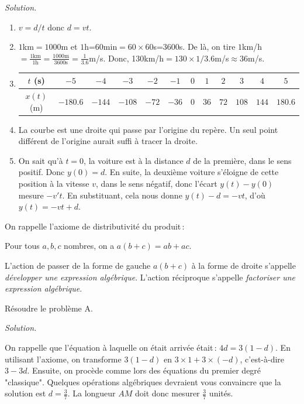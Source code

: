 		\textit{Solution.} 
		\begin{enumerate}
			\item $v=d/t$ donc $d=vt$.
			\item $1$km$=1000$m et $1$h=$60$min$=60\times 60$s=$3600$s. De là, on tire $1$km/h $=\frac{1\text{km}}{1\text{h}}=\frac{1000\text{m}}{3600\text{s}}=\frac{1}{3.6}$m/s. Donc, 130km/h$=130\times 1/3.6$m/s$\approx 36$m/s.
			\item 

			\begin{tabular}{c|c|c|c|c|c|c|c|c|c|c|c}
				$t$ (s) &$     -5 $&$    -4$&$  -3 $&$   -2 $&$ -1$&$ 0$&$ 1 $&$  2 $&$ 3$&$ 4  $&$ 5 $\\
				\hline
				$x(t)$ (m)&$-180.6 $&$ -144 $&$-108 $&$ -72  $&$-36$&$ 0$&$ 36$&$ 72 $&$108$&$ 144 $& $180.6$ 
			\end{tabular}
			\item La courbe est une droite qui passe par l'origine du repère. Un seul point différent de l'origine aurait suffi à tracer la droite.
			\item On sait qu'à $t=0$, la voiture est à la distance $d$ de la première, dans le sens positif. Donc $y(0)=d$. En suite, la deuxième voiture s'éloigne de cette position à la vitesse $v$, dans le sens négatif, donc l'écart $y(t)-y(0)$ mesure $-v't$. En substituant, cela nous donne $y(t)-d=-vt$, d'où $y(t)=-vt+d$.

		\end{enumerate}

		\begin{exo}
			On rappelle l'axiome de distributivité du produit\,: 

			\begin{axi}
				Pour tous $a,b,c$ nombres, on a $a(b+c)=a b+ a c$.
			\end{axi}	

			L'action de passer de la forme de gauche $a(b+c)$ à la forme de droite s'appelle \emph{développer une expression algébrique}. L'action réciproque s'appelle \emph{factoriser une expression algébrique}.

			Résoudre le problème A.				
		\end{exo}

		\noindent\emph{Solution.}

		On rappelle que l'équation à laquelle on était arrivée était\,: $4d=3(1-d)$. En utilisant l'axiome, on transforme $3(1-d)$ en $3\times 1+3\times(-d)$, c'est-à-dire $3-3d$. Ensuite, on procède comme lors des équations du premier degré "classique". Quelques opérations algébriques devraient vous convaincre que la solution est $d=\frac{3}{7}$. La longueur $AM$ doit donc mesurer $\frac{3}{7}$ unités. 


